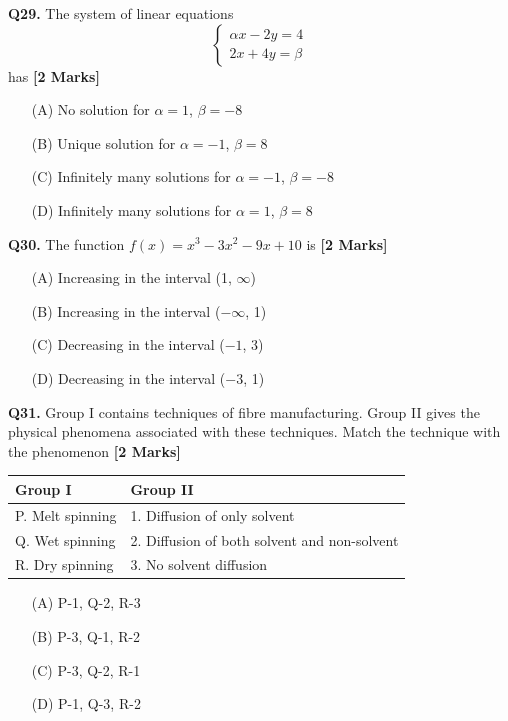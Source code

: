 \documentclass[11pt]{article}
\newcommand{\questionb}[2]{
    \noindent\textbf{Q#2.} #1 \hfill \textbf{[2 Marks]}
}
\begin{document}
\questionb{The system of linear equations
\[\begin{cases} 
\alpha x - 2y = 4 \\ 
2x + 4y = \beta 
\end{cases}\]  
has}{29}
\begin{enumerate}
    \item[(A)] No solution for \(\alpha = 1\), \(\beta = -8\)  
    \item[(B)] Unique solution for \(\alpha = -1\), \(\beta = 8\)  
    \item[(C)] Infinitely many solutions for \(\alpha = -1\), \(\beta = -8\)  
    \item[(D)] Infinitely many solutions for \(\alpha = 1\), \(\beta = 8\)
\end{enumerate}
\vspace{0.5cm}

\questionb{The function \( f(x) = x^3 - 3x^2 - 9x + 10 \) is}{30}
\begin{enumerate}
    \item[(A)] Increasing in the interval (1, \(\infty\))  
    \item[(B)] Increasing in the interval (\(-\infty\), 1)  
    \item[(C)] Decreasing in the interval (\(-1\), 3)  
    \item[(D)] Decreasing in the interval (\(-3\), 1)  
\end{enumerate}
\vspace{0.5cm}

\questionb{Group I contains techniques of fibre manufacturing. Group II gives the physical phenomena associated with these techniques. Match the technique with the phenomenon}{31}

\begin{center}
\begin{tabular}{|l|l|}
\hline
\textbf{Group I} & \textbf{Group II} \\
\hline
P. Melt spinning & 1. Diffusion of only solvent \\
Q. Wet spinning & 2. Diffusion of both solvent and non-solvent \\
R. Dry spinning & 3. No solvent diffusion \\
\hline
\end{tabular}
\end{center}

\begin{enumerate}
    \item[(A)] P-1, Q-2, R-3  
    \item[(B)] P-3, Q-1, R-2  
    \item[(C)] P-3, Q-2, R-1  
    \item[(D)] P-1, Q-3, R-2  
\end{enumerate}
\vspace{0.5cm}
\end{document}
